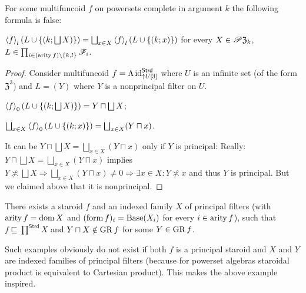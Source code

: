 \begin{example}
For some multifuncoid $f$ on powersets complete in argument $k$
the following formula is false:

$\left\langle f\right\rangle_{l}\left(L\cup\left\{ \left(k;\bigsqcup X\right)\right\} \right)=\bigsqcup_{x\in X}\left\langle f\right\rangle_{l}(L\cup\{(k;x)\})$
for every $X\in\mathscr{P}\mathfrak{Z}_{k}$, $L\in\prod_{i\in(\operatorname{arity} f)\setminus\{k,l\}}\mathscr{F}_{i}$.\end{example}
\begin{proof}
Consider multifuncoid $f=\Lambda\operatorname{id}_{\uparrow U[3]}^{\mathsf{Strd}}$
where $U$ is an infinite set (of the form $\mathfrak{Z}^{3}$) and
$L=(Y)$ where $Y$ is a nonprincipal filter on $U$.

$\left\langle f\right\rangle_{0}\left(L\cup\left\{ \left(k;\bigsqcup X\right)\right\} \right)=Y\sqcap\bigsqcup X$;

$\bigsqcup_{x\in X}\left\langle f\right\rangle_{0}(L\cup\{(k;x)\})=\bigsqcup_{x\in X}(Y\sqcap x)$.

It can be $Y\sqcap\bigsqcup X=\bigsqcup_{x\in X}(Y\sqcap x)$ only
if $Y$ is principal: Really: $Y\sqcap\bigsqcup X=\bigsqcup_{x\in X}(Y\sqcap x)$
implies $Y\nasymp\bigsqcup X\Rightarrow\bigsqcup_{x\in X}(Y\sqcap x)\neq0\Rightarrow\exists x\in X:Y\nasymp x$
and thus $Y$ is principal. But we claimed above that it is nonprincipal.\end{proof}
\begin{example}
There exists a staroid $f$ and an indexed family $X$ of principal
filters (with $\operatorname{arity} f=\operatorname{dom} X$ and $(\operatorname{form} f)_{i}=\operatorname{Base}(X_{i})$
for every $i\in\operatorname{arity} f$), such that $f\sqsubseteq\prod^{\mathsf{Strd}}X$
and $Y\sqcap X\notin\operatorname{GR} f$ for some $Y\in\operatorname{GR} f$.\end{example}
\begin{rem}
Such examples obviously do not exist if both $f$ is a principal staroid
and $X$ and $Y$ are indexed families of principal filters (because
for powerset algebras staroidal product is equivalent to Cartesian
product). This makes the above example inspired.\end{rem}
